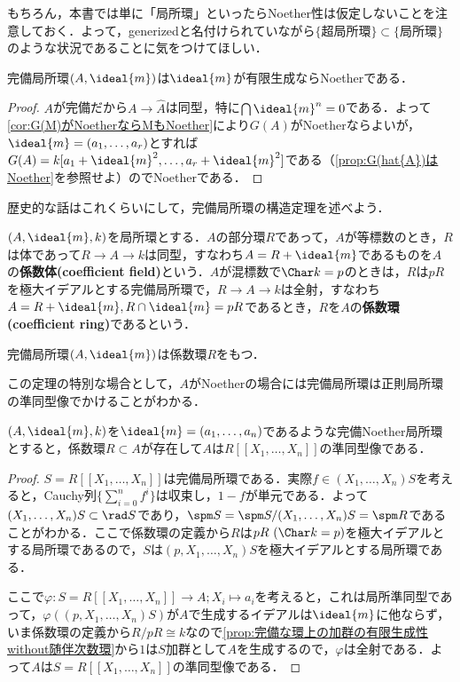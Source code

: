 もちろん，本書では単に「局所環」といったらNoether性は仮定しないことを注意しておく．よって，generizedと名付けられていながら$\{\text{超局所環}\}\subset\{\text{局所環}\}$のような状況であることに気をつけてほしい．

\begin{prop}
	完備局所環$(A,\ideal{m})$は$\ideal{m}$が有限生成ならNoetherである．
\end{prop}
\begin{proof}
	$A$が完備だから$A\to\widehat{A}$は同型，特に$\bigcap\ideal{m}^n=0$である．よって\ref{cor:G(M)がNoetherならMもNoether}により$G(A)$がNoetherならよいが，$\ideal{m}=(a_1,\dots,a_r)$とすれば$G(A)=k[a_1+\ideal{m}^2,\dots,a_r+\ideal{m}^2]$である（\ref{prop:G(hat{A})はNoether}を参照せよ）のでNoetherである．
\end{proof}

歴史的な話はこれくらいにして，完備局所環の構造定理を述べよう．

\begin{defi}[係数環]
	$(A,\ideal{m},k)$を局所環とする．$A$の部分環$R$であって，$A$が等標数のとき，$R$は体であって$R\to A\to k$は同型，すなわち$A=R+\ideal{m}$であるものを$A$の\textbf{係数体(coefficient field)}という．$A$が混標数で$\Char k=p$のときは，$R$は$pR$を極大イデアルとする完備局所環で，$R\to A\to k$は全射，すなわち$A=R+\ideal{m}, R\cap\ideal{m}=pR$であるとき，$R$を$A$の\textbf{係数環(coefficient ring)}であるという．
\end{defi}

\begin{thm}[Cohenの完備局所環の構造定理]
	完備局所環$(A,\ideal{m})$は係数環$R$をもつ．
\end{thm}

この定理の特別な場合として，$A$がNoetherの場合には完備局所環は正則局所環の準同型像でかけることがわかる．
\begin{thm}[完備Noether局所環の構造定理]
	$(A,\ideal{m},k)$を$\ideal{m}=(a_1,\dots,a_n)$であるような完備Noether局所環とすると，係数環$R\subset A$が存在して$A$は$R[[ X_1,\dots,X_n]]$の準同型像である．
\end{thm}

\begin{proof}
	$S=R[[ X_1,\dots,X_n]]$は完備局所環である．実際$f\in(X_1,\dots,X_n)S$を考えると，Cauchy列$\{\sum_{i=0}^n f^i\}$は収束し，$1-f$が単元である．よって$(X_1,\dots,X_n)S\subset\rad S$であり，$\spm S=\spm S/(X_1,\dots,X_n)S=\spm R$であることがわかる．ここで係数環の定義から$R$は$pR~(\Char k=p)$を極大イデアルとする局所環であるので，$S$は$(p,X_1,\dots,X_n)S$を極大イデアルとする局所環である．
	
	ここで$\varphi:S=R[[ X_1,\dots,X_n]]\to A;X_i\mapsto a_i$を考えると，これは局所準同型であって，$\varphi((p,X_1,\dots,X_n)S)$が$A$で生成するイデアルは$\ideal{m}$に他ならず，いま係数環の定義から$R/pR\cong k$なので\ref{prop:完備な環上の加群の有限生成性without随伴次数環}から$1$は$S$加群として$A$を生成するので，$\varphi$は全射である．よって$A$は$S=R[[ X_1,\dots,X_n]]$の準同型像である．
\end{proof}

